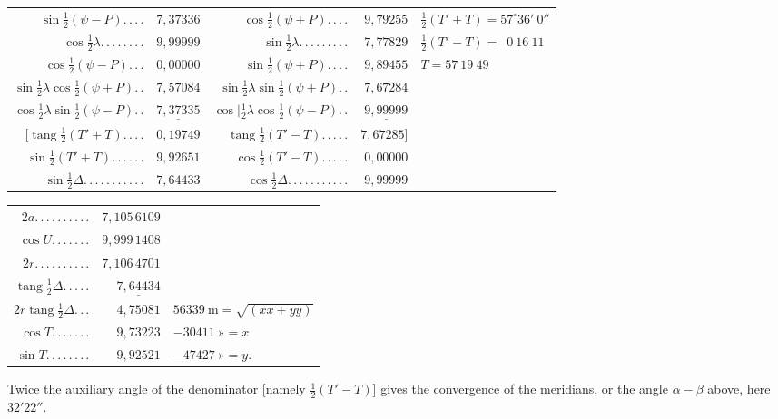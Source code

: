 \begin{center}
\begingroup\fontsize{8}{11}\selectfont\setlength{\tabcolsep}{3pt}\renewcommand{\arraystretch}{1.4}
\begin{tabular}{@{}r@{ }r@{\quad}r@{ }r@{\quad}l@{}}
$\sin\tfrac12(\psi-P).\,.\,.\,.$&$7{,}37336$&$\cos\tfrac12(\psi+P).\,.\,.\,.$&$9{,}79255$&$\tfrac12(T'+T)=57^\circ36'\ 0''$\\
$\cos\tfrac12\lambda.\,.\,.\,.\,.\,.\,.\,.$&$9{,}99999$&$\sin\tfrac12\lambda.\,.\,.\,.\,.\,.\,.\,.\,.$&$7{,}77829$&$\tfrac12(T'-T)=\phantom{5}0\ 16\ 11$\\
$\cos\tfrac12(\psi-P).\,.\,.$&$0{,}00000$&$\sin\tfrac12(\psi+P).\,.\,.\,.$&$9{,}89455$&$T=57\ 19\ 49$\\\cline{1-2}\cline{3-4}
$\sin\tfrac12\lambda\cos\tfrac12(\psi+P).\,.$&$7{,}57084$&$\sin\tfrac12\lambda\sin\tfrac12(\psi+P).\,.$&$7{,}67284$&\\
$\cos\tfrac12\lambda\sin\tfrac12(\psi-P).\,.$&$\underline{7{,}37335}$&$\cos\mathord{|}\tfrac12\lambda\cos\tfrac12(\psi-P).\,.$&$\underline{9{,}99999}$&\\
$[\operatorname{tang}\tfrac12(T'+T).\,.\,.\,.$&$0{,}19749$&$\operatorname{tang}\tfrac12(T'-T).\,.\,.\,.\,.$&$7{,}67285]$&\\
$\sin\tfrac12(T'+T).\,.\,.\,.\,.\,.$&$9{,}92651$&$\cos\tfrac12(T'-T).\,.\,.\,.\,.$&$0{,}00000$&\\
$\sin\tfrac12\Delta.\,.\,.\,.\,.\,.\,.\,.\,.\,.\,.$&$7{,}64433$&$\cos\tfrac12\Delta.\,.\,.\,.\,.\,.\,.\,.\,.\,.\,.$&$9{,}99999$&
\end{tabular}\par\endgroup
\end{center}
\begin{center}
\begingroup\small\renewcommand{\arraystretch}{1.15}
\begin{tabular}{r@{ }r@{\qquad}l}
$2a.\,.\,.\,.\,.\,.\,.\,.\,.\,.$&$7{,}105\,6109$&\\
$\cos U.\,.\,.\,.\,.\,.\,.$&$\underline{9{,}999\,1408}$&\\
$2r.\,.\,.\,.\,.\,.\,.\,.\,.\,.$&$7{,}106\,4701$&\\
$\operatorname{tang}\tfrac12\Delta.\,.\,.\,.\,.$&$\underline{7{,}64434}$&\\
$2r\operatorname{tang}\tfrac12\Delta.\,.\,.$&$4{,}75081$&$56339\ \mathrm m=\sqrt{(xx+yy)}$\\
$\cos T.\,.\,.\,.\,.\,.\,.$&$9{,}73223$&$-30411\ \text{»}=x$\\
$\sin T.\,.\,.\,.\,.\,.\,.\,.$&$9{,}92521$&$-47427\ \text{»}=y.$
\end{tabular}\par\endgroup
\end{center}
Twice the auxiliary angle of the denominator [namely $\tfrac12(T'-T)$] gives the convergence of the meridians, or the angle $\alpha-\beta$ above, here $32'22''$.

